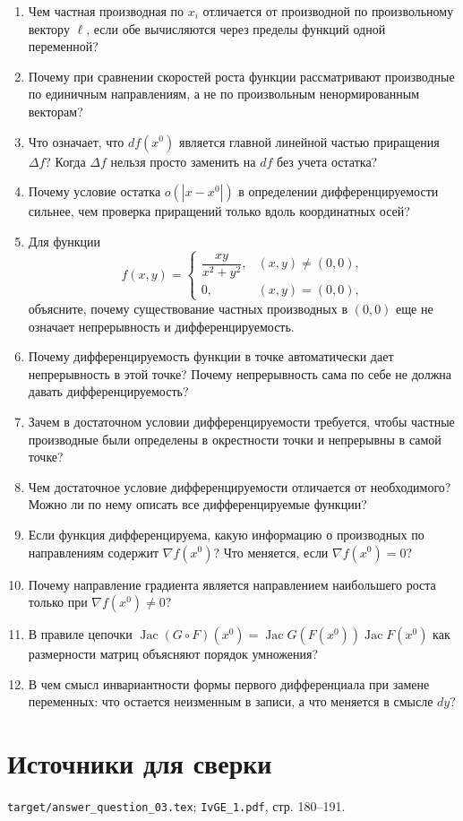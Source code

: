 \documentclass[12pt,a4paper]{article}
\begin{document}
\begin{enumerate}
\item Чем частная производная по \(x_i\) отличается от производной по произвольному вектору \(\ell\), если обе вычисляются через пределы функций одной переменной?
\item Почему при сравнении скоростей роста функции рассматривают производные по единичным направлениям, а не по произвольным ненормированным векторам?
\item Что означает, что \(df(x^0)\) является главной линейной частью приращения \(\Delta f\)? Когда \(\Delta f\) нельзя просто заменить на \(df\) без учета остатка?
\item Почему условие остатка \(o(|x-x^0|)\) в определении дифференцируемости сильнее, чем проверка приращений только вдоль координатных осей?
\item Для функции
\[
  f(x,y)=
  \begin{cases}
  \dfrac{xy}{x^2+y^2}, & (x,y)\ne(0,0),\\
  0, & (x,y)=(0,0),
  \end{cases}
\]
объясните, почему существование частных производных в \((0,0)\) еще не означает непрерывность и дифференцируемость.
\item Почему дифференцируемость функции в точке автоматически дает непрерывность в этой точке? Почему непрерывность сама по себе не должна давать дифференцируемость?
\item Зачем в достаточном условии дифференцируемости требуется, чтобы частные производные были определены в окрестности точки и непрерывны в самой точке?
\item Чем достаточное условие дифференцируемости отличается от необходимого? Можно ли по нему описать все дифференцируемые функции?
\item Если функция дифференцируема, какую информацию о производных по направлениям содержит \(\nabla f(x^0)\)? Что меняется, если \(\nabla f(x^0)=0\)?
\item Почему направление градиента является направлением наибольшего роста только при \(\nabla f(x^0)\ne0\)?
\item В правиле цепочки \(\operatorname{Jac}(G\circ F)(x^0)=\operatorname{Jac}G(F(x^0))\operatorname{Jac}F(x^0)\) как размерности матриц объясняют порядок умножения?
\item В чем смысл инвариантности формы первого дифференциала при замене переменных: что остается неизменным в записи, а что меняется в смысле \(dy\)?
\end{enumerate}

\section*{Источники для сверки}

\texttt{target/answer\_question\_03.tex};
\texttt{IvGE\_1.pdf}, стр. 180--191.
\end{document}

